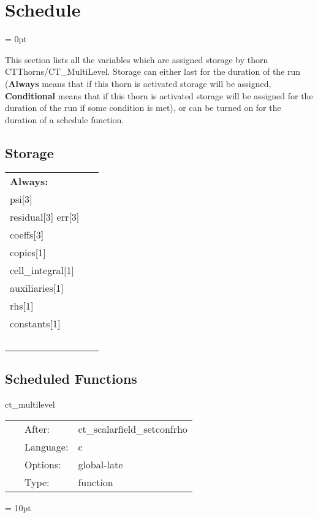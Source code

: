 
\section{Schedule} 


\parskip = 0pt


\noindent This section lists all the variables which are assigned storage by thorn CTThorns/CT\_MultiLevel.  Storage can either last for the duration of the run ({\bf Always} means that if this thorn is activated storage will be assigned, {\bf Conditional} means that if this thorn is activated storage will be assigned for the duration of the run if some condition is met), or can be turned on for the duration of a schedule function.


\subsection*{Storage}

\hspace{5mm}

 \begin{tabular*}{160mm}{ll} 

{\bf Always:}&  ~ \\ 
 psi[3] & ~\\ 
 residual[3] err[3] & ~\\ 
 coeffs[3] & ~\\ 
 copies[1] & ~\\ 
 cell\_integral[1] & ~\\ 
 auxiliaries[1] & ~\\ 
 rhs[1] & ~\\ 
 constants[1] & ~\\ 
~ & ~\\ 
\end{tabular*} 


\subsection*{Scheduled Functions}
\vspace{5mm}


\hspace{5mm} ct\_multilevel 

\hspace{5mm}{\it main multilevel function } 


\hspace{5mm}

 \begin{tabular*}{160mm}{cll} 
~ & After:  & ct\_scalarfield\_setconfrho \\ 
~ & Language:  & c \\ 
~ & Options:  & global-late \\ 
~ & Type:  & function \\ 
\end{tabular*} 



\vspace{5mm}\parskip = 10pt 
